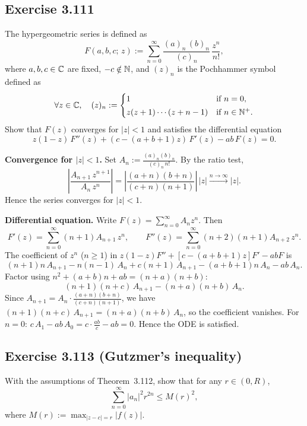 \documentclass{article}
\begin{document}
\subsection{Exercise 3.111}

The hypergeometric series is defined as
\[
  F(a,b,c;\,z) := \sum_{n=0}^{\infty}
  \frac{(a)_n\,(b)_n}{(c)_n}\,\frac{z^n}{n!},
\]
where $a, b, c \in \mathbb{C}$ are fixed, $-c \notin \mathbb{N}$,
and $(z)_n$ is the Pochhammer symbol defined as
\[
  \forall z \in \mathbb{C},\quad (z)_n :=
  \begin{cases} 1 & \text{if } n = 0, \\[2pt]
    z(z+1)\cdots(z+n-1) & \text{if } n \in \mathbb{N}^+.
  \end{cases}
\]
Show that $F(z)$ converges for $|z|<1$ and satisfies
the differential equation
\[
  z(1-z)\,F''(z) + (c-(a+b+1)z)\,F'(z) - ab\,F(z) = 0.
\]

\begin{solution}
  \textbf{Convergence for $|z| < 1$.}\;
  Set $A_n := \frac{(a)_n(b)_n}{(c)_n\,n!}$.
  By the ratio test,
  \[
    \left|\frac{A_{n+1}\,z^{n+1}}{A_n\,z^n}\right|
    = \left|\frac{(a+n)(b+n)}{(c+n)(n+1)}\right|\,|z|
    \xrightarrow{n\to\infty}|z|.
  \]
  Hence the series converges for $|z| < 1$.

  \textbf{Differential equation.}\;
  Write $F(z) = \sum_{n=0}^{\infty} A_n z^n$.
  Then
  \[
    F'(z) = \sum_{n=0}^{\infty} (n+1)A_{n+1}\,z^n,
    \qquad
    F''(z) = \sum_{n=0}^{\infty} (n+2)(n+1)A_{n+2}\,z^n.
  \]
  The coefficient of $z^n$ ($n \ge 1$) in
  $z(1-z)F'' + [c-(a+b+1)z]F' - abF$ is
  \[
    (n+1)n\,A_{n+1} - n(n-1)\,A_n
    + c(n+1)\,A_{n+1} - (a+b+1)n\,A_n - ab\,A_n.
  \]
  Factor using $n^2 + (a+b)n + ab = (n+a)(n+b)$:
  \[
    (n+1)(n+c)\,A_{n+1} - (n+a)(n+b)\,A_n.
  \]
  Since $A_{n+1} = A_n \cdot \frac{(a+n)(b+n)}{(c+n)(n+1)}$,
  we have $(n+1)(n+c)\,A_{n+1} = (n+a)(n+b)\,A_n$,
  so the coefficient vanishes.
  For $n = 0$: $c\,A_1 - ab\,A_0 = c \cdot \frac{ab}{c} - ab = 0$.
  Hence the ODE is satisfied.\qedhere
\end{solution}

\subsection{Exercise 3.113 (Gutzmer's inequality)}

With the assumptions of Theorem~3.112,
show that for any $r \in (0, R)$,
\[
  \sum_{n=0}^{\infty} |a_n|^2 r^{2n} \le M(r)^2,
\]
where $M(r) := \max_{|z-c|=r} |f(z)|$.
\end{document}
